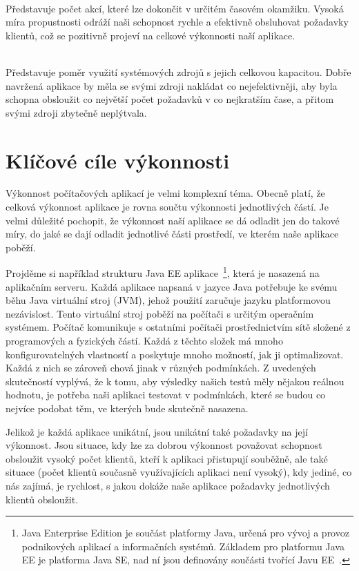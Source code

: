 \documentclass[122pt,oneside]{fithesis}
\begin{document}
\vspace{5 mm}
\\\indent Představuje počet akcí, které lze dokončit v určitém časovém okamžiku. Vysoká míra propustnosti odráží naši schopnost rychle a efektivně obsluhovat požadavky klientů, což se pozitivně projeví na celkové výkonnosti naší aplikace.

\vspace{5 mm}
\\\indent Představuje poměr využití systémových zdrojů s jejich celkovou kapacitou. Dobře navržená aplikace by měla se svými zdroji nakládat co nejefektivněji, aby byla schopna obsloužit co největší počet požadavků v co nejkratším čase, a přitom svými zdroji zbytečně neplýtvala.

\section{Klíčové cíle výkonnosti}
Výkonnost počítačových aplikací je velmi komplexní téma. Obecně platí, že celková výkonnost aplikace je rovna součtu výkonnosti jednotlivých částí. Je velmi důležité pochopit, že výkonnost naší aplikace se dá odladit jen do takové míry, do jaké se dají odladit jednotlivé části prostředí, ve kterém naše aplikace poběží. 

Projděme si například strukturu Java EE aplikace~\footnote{Java Enterprise Edition je součást platformy Java, určená pro vývoj a provoz podnikových aplikací a informačních systémů. Základem pro platformu Java EE je platforma Java SE, nad ní jsou definovány součásti tvořící Javu EE~\cite{wikiJavaEE}.}, která je nasazená na aplikačním serveru. Každá aplikace napsaná v jazyce Java potřebuje ke svému běhu Java virtuální stroj (JVM), jehož použití zaručuje jazyku platformovou nezávislost. Tento virtuální stroj poběží na počítači s určitým operačním systémem. Počítač komunikuje s ostatními počítači prostřednictvím sítě složené z programových a fyzických částí. Každá z těchto složek má mnoho konfigurovatelných vlastností a poskytuje mnoho možností, jak ji optimalizovat. Každá z nich se zároveň chová jinak v různých podmínkách. Z uvedených skutečností vyplývá, že k tomu, aby výsledky našich testů měly nějakou reálnou hodnotu, je potřeba naši aplikaci testovat v podmínkách, které se budou co nejvíce podobat těm, ve kterých bude skutečně nasazena.

Jelikož je každá aplikace unikátní, jsou unikátní také požadavky na její výkonnost. Jsou situace, kdy lze za dobrou výkonnost považovat schopnost obsloužit vysoký počet klientů, kteří k aplikaci přistupují souběžně, ale také situace (počet klientů současně využívajících aplikaci není vysoký), kdy jediné, co nás zajímá, je rychlost, s jakou dokáže naše aplikace požadavky jednotlivých klientů obsloužit.
 
\end{document}
